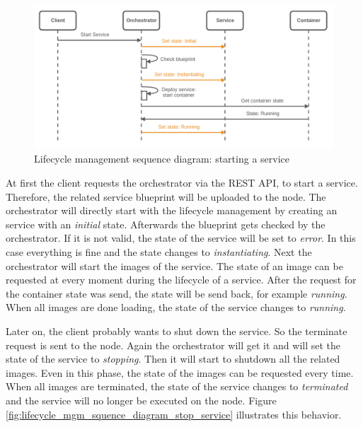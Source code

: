 \begin{figure}[H]
    \centering
    \includegraphics[width=\textwidth]{resources/images/lifecycle_sequence_diagram_start_service.png}
    \caption[Lifecycle management sequence diagram: starting a service]{Lifecycle management sequence diagram: starting a service}
    \label{fig:lifecycle_mgm_squence_diagram_start_service}
\end{figure}

At first the client requests the orchestrator via the \ac{REST} \ac{API}, to start a service.
Therefore, the related service blueprint will be uploaded to the node.
The orchestrator will directly start with the lifecycle management by creating an service with an \textit{initial} state.
Afterwards the blueprint gets checked by the orchestrator.
If it is not valid, the state of the service will be set to \textit{error}.
In this case everything is fine and the state changes to \textit{instantiating}.
Next the orchestrator will start the images of the service.
The state of an image can be requested at every moment during the lifecycle of a service.
After the request for the container state was send, the state will be send back, for example \textit{running}.
When all images are done loading, the state of the service changes to \textit{running}.

Later on, the client probably wants to shut down the service.
So the terminate request is sent to the node.
Again the orchestrator will get it and will set the state of the service to \textit{stopping}.
Then it will start to shutdown all the related images.
Even in this phase, the state of the images can be requested every time.
When all images are terminated, the state of the service changes to \textit{terminated} and the service will no longer be executed on the node.
Figure \ref{fig:lifecycle_mgm_squence_diagram_stop_service} illustrates this behavior.

